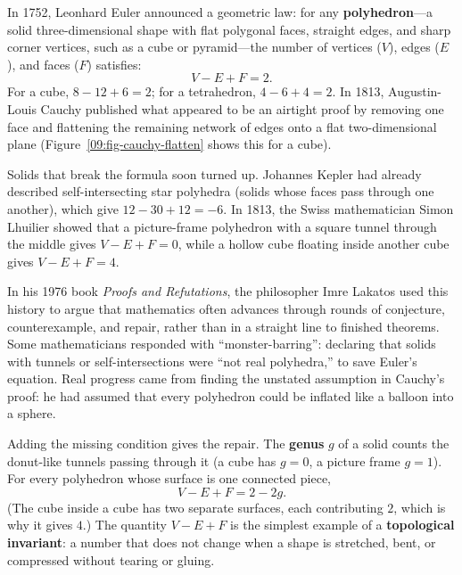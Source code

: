 \begin{historybox}
In 1752, Leonhard Euler announced a geometric law: for any \textbf{polyhedron}---a solid three-dimensional shape with flat polygonal faces, straight edges, and sharp corner vertices, such as a cube or pyramid---the number of vertices ($V$), edges ($E$), and faces ($F$) satisfies:
\[
V - E + F = 2.
\]
For a cube, $8 - 12 + 6 = 2$; for a tetrahedron, $4 - 6 + 4 = 2$. In 1813, Augustin-Louis Cauchy published what appeared to be an airtight proof by removing one face and flattening the remaining network of edges onto a flat two-dimensional plane (Figure~\ref{09:fig-cauchy-flatten} shows this for a cube).

Solids that break the formula soon turned up. Johannes Kepler had already described self-intersecting star polyhedra (solids whose faces pass through one another), which give $12 - 30 + 12 = -6$. In 1813, the Swiss mathematician Simon Lhuilier showed that a picture-frame polyhedron with a square tunnel through the middle gives $V - E + F = 0$, while a hollow cube floating inside another cube gives $V - E + F = 4$.

In his 1976 book \emph{Proofs and Refutations}, the philosopher Imre Lakatos used this history to argue that mathematics often advances through rounds of conjecture, counterexample, and repair, rather than in a straight line to finished theorems. Some mathematicians responded with ``monster-barring'': declaring that solids with tunnels or self-intersections were ``not real polyhedra,'' to save Euler's equation. Real progress came from finding the unstated assumption in Cauchy's proof: he had assumed that every polyhedron could be inflated like a balloon into a sphere.

Adding the missing condition gives the repair. The \textbf{genus} $g$ of a solid counts the donut-like tunnels passing through it (a cube has $g = 0$, a picture frame $g = 1$). For every polyhedron whose surface is one connected piece,
\[
V - E + F = 2 - 2g.
\]
(The cube inside a cube has two separate surfaces, each contributing $2$, which is why it gives $4$.) The quantity $V - E + F$ is the simplest example of a \textbf{topological invariant}: a number that does not change when a shape is stretched, bent, or compressed without tearing or gluing.
\end{historybox}

